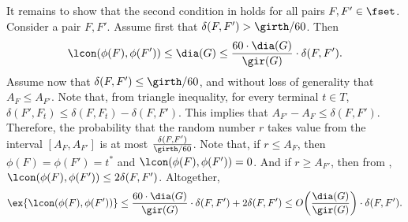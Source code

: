 It remains to show that the second condition in  holds for all pairs $F,F'\in \fset$. Consider a pair $F,F'$.
Assume first that $\delta(F,F')>\girth/60$. Then $$\lcon(\phi(F),\phi(F')) \le \dia(G) \le \frac{60 \cdot \dia(G)}{\gir(G)}\cdot \delta(F,F').$$ 
Assume now that $\delta(F,F') \le \girth/60$, and without loss of generality that $A_{F} \le A_{F'}$. 
Note that, from triangle inequality, for every terminal $t\in T$, $\delta(F',F_t)\le \delta(F,F_t)-\delta(F,F')$. This implies that $A_{F'}-A_{F} \le \delta(F,F')$. Therefore, the probability that the random number $r$ takes value from the interval $[A_{F}, A_{F'}]$ is at most $\frac{\delta(F,F')}{\girth/60}$. %
Note that, if $r\le A_{F}$, then $\phi(F)=\phi(F')=t^*$ and $\lcon(\phi(F),\phi(F'))=0$.
And  if $r\ge A_{F'}$, then from , $\lcon(\phi(F),\phi(F')) \le 2\delta(F,F')$. Altogether,
$$\ex{\lcon(\phi(F),\phi(F'))} \le \frac{60\cdot \dia(G)}{\gir(G)} \cdot\delta(F,F') + 2 \delta(F,F') \le O\bigg(\frac{\dia(G)}{\gir(G)}\bigg)\cdot \delta(F,F').$$

